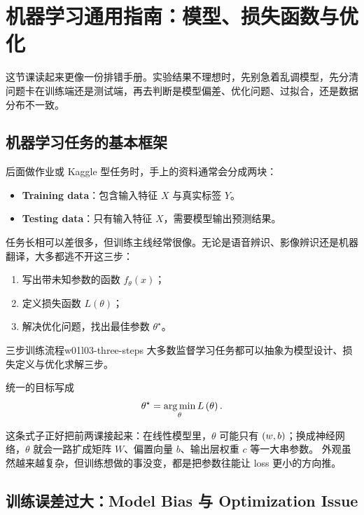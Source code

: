 \documentclass[main.tex]{subfiles}
\begin{document}
\chapter{机器学习通用指南：模型、损失函数与优化}
\label{chap:w01l03-model-loss-optimization}

\begin{examplebox}
这节课读起来更像一份排错手册。实验结果不理想时，先别急着乱调模型，先分清问题卡在训练端还是测试端，再去判断是模型偏差、优化问题、过拟合，还是数据分布不一致。
\end{examplebox}

\section{机器学习任务的基本框架}
\label{sec:w01l03-basic-framework}

后面做作业或 Kaggle 型任务时，手上的资料通常会分成两块：
\begin{itemize}
  \item \textbf{Training data}：包含输入特征 $X$ 与真实标签 $Y$。
  \item \textbf{Testing data}：只有输入特征 $X$，需要模型输出预测结果。
\end{itemize}

任务长相可以差很多，但训练主线经常很像。无论是语音辨识、影像辨识还是机器翻译，大多都逃不开这三步：
\begin{enumerate}
  \item 写出带未知参数的函数 $f_\theta(x)$；
  \item 定义损失函数 $L(\theta)$；
  \item 解决优化问题，找出最佳参数 $\theta^\star$。
\end{enumerate}

\begin{fact}{三步训练流程}{w01l03-three-steps}
大多数监督学习任务都可以抽象为模型设计、损失定义与优化求解三步。
\end{fact}

统一的目标写成
\begin{equation}
  \theta^\star = \operatorname*{arg\,min}_{\theta} L\left( \theta \right).
  \label{eq:w01l03-optimization}
\end{equation}

这条式子正好把前两课接起来：在线性模型里，$\theta$ 可能只有 $\left( w,b \right)$；换成神经网络，$\theta$ 就会一路扩成矩阵 $W$、偏置向量 $b$、输出层权重 $c$ 等一大串参数。
外观虽然越来越复杂，但训练想做的事没变，都是把参数往能让 loss 更小的方向推。

\section{训练误差过大：Model Bias 与 Optimization Issue}
\label{sec:w01l03-training-loss}
\end{document}
